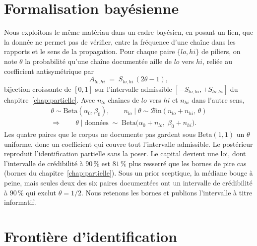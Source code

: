 
\section{Formalisation bayésienne}
\label{sec:bayes}

Nous exploitons le même matériau dans un cadre bayésien, en posant un lien, que la donnée ne permet pas de vérifier, entre la fréquence d'une chaîne dans les rapports et le sens de la propagation. Pour chaque paire
$\{lo,hi\}$ de piliers, on note $\theta$ la probabilité qu'une chaîne documentée aille de $lo$ vers $hi$,
reliée au coefficient antisymétrique par
\[
  A_{lo,hi} \;=\; S_{lo,hi}\,(2\theta - 1),
\]
bijection croissante de $[0,1]$ sur l'intervalle admissible $[-S_{lo,hi},+S_{lo,hi}]$ du
chapitre~\ref{chap:partielle}. Avec $n_{lo}$ chaînes de $lo$ vers $hi$ et $n_{hi}$ dans l'autre sens,
\begin{equation}
  \begin{gathered}
  \theta \sim \mathrm{Beta}(\alpha_0,\beta_0),
  \qquad
  n_{lo}\mid\theta \sim \mathcal{B}\mathrm{in}(n_{lo}+n_{hi},\,\theta)
  \\
  \Longrightarrow\qquad
  \theta \mid \text{données} \;\sim\; \mathrm{Beta}\bigl(\alpha_0+n_{lo},\;\beta_0+n_{hi}\bigr).
  \end{gathered}
  \label{eq:posterieur-beta}
\end{equation}
Les quatre paires que le corpus ne documente pas gardent sous $\mathrm{Beta}(1,1)$ un $\theta$
uniforme, donc un coefficient qui couvre tout l'intervalle admissible. Le postérieur reproduit
l'identification partielle sans la poser. Le capital devient une loi, dont l'intervalle de
crédibilité à $90\,\%$ est $81\,\%$ plus resserré que les bornes de pire cas
(bornes du chapitre~\ref{chap:partielle}). Sous un prior sceptique, la médiane bouge à peine, mais seules deux des six
paires documentées ont un intervalle de crédibilité à $90\,\%$ qui exclut $\theta=1/2$. Nous retenons les bornes et publions l'intervalle à titre informatif.

\section{Frontière d'identification}

